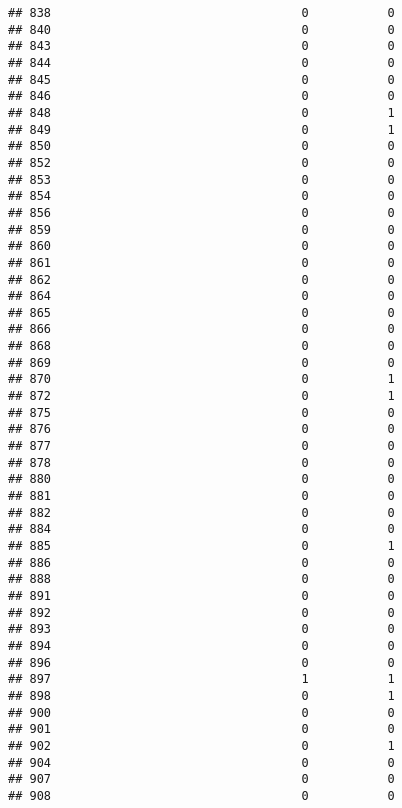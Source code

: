 \documentclass[
]{article}
\begin{document}
\begin{verbatim}
## 838                                   0           0
## 840                                   0           0
## 843                                   0           0
## 844                                   0           0
## 845                                   0           0
## 846                                   0           0
## 848                                   0           1
## 849                                   0           1
## 850                                   0           0
## 852                                   0           0
## 853                                   0           0
## 854                                   0           0
## 856                                   0           0
## 859                                   0           0
## 860                                   0           0
## 861                                   0           0
## 862                                   0           0
## 864                                   0           0
## 865                                   0           0
## 866                                   0           0
## 868                                   0           0
## 869                                   0           0
## 870                                   0           1
## 872                                   0           1
## 875                                   0           0
## 876                                   0           0
## 877                                   0           0
## 878                                   0           0
## 880                                   0           0
## 881                                   0           0
## 882                                   0           0
## 884                                   0           0
## 885                                   0           1
## 886                                   0           0
## 888                                   0           0
## 891                                   0           0
## 892                                   0           0
## 893                                   0           0
## 894                                   0           0
## 896                                   0           0
## 897                                   1           1
## 898                                   0           1
## 900                                   0           0
## 901                                   0           0
## 902                                   0           1
## 904                                   0           0
## 907                                   0           0
## 908                                   0           0

\end{verbatim}
\end{document}
